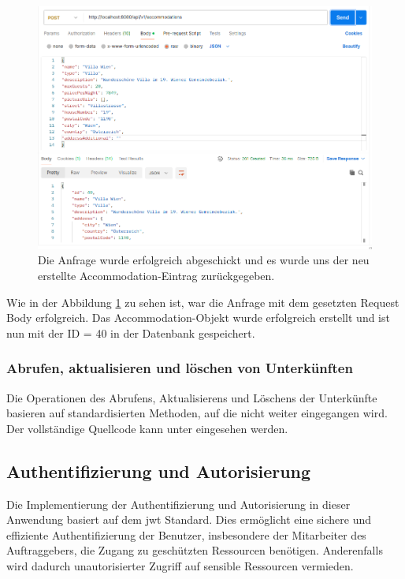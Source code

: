 		\begin{figure}
			\centering
			\includegraphics[width=1\textwidth]{images/impl-new-booking-post-acc-req.png}
			\caption{Die Anfrage wurde erfolgreich abgeschickt und es wurde uns der neu erstellte Accommodation-Eintrag zurückgegeben.}
            \label{impl-new-booking-post-acc-req}
		\end{figure}
		
		Wie in der Abbildung \ref{impl-new-booking-post-acc-req} zu sehen ist, war die Anfrage mit dem gesetzten Request Body erfolgreich. Das Accommodation-Objekt wurde erfolgreich erstellt und ist nun mit der ID = 40 in der Datenbank gespeichert. 
		
		\subsubsection{Abrufen, aktualisieren und löschen von Unterkünften}
		
		Die Operationen des Abrufens, Aktualisierens und Löschens der Unterkünfte basieren auf standardisierten Methoden, auf die nicht weiter eingegangen wird. Der vollständige Quellcode kann unter \cite{website-git-backend-repo} eingesehen werden.
		
		\subsection{Authentifizierung und Autorisierung}
		
		Die Implementierung der Authentifizierung und Autorisierung in dieser Anwendung basiert auf dem \gls{jwt} Standard. Dies ermöglicht eine sichere und effiziente Authentifizierung der Benutzer, insbesondere der Mitarbeiter des Auftraggebers, die Zugang zu geschützten Ressourcen benötigen. Anderenfalls wird dadurch unautorisierter Zugriff auf sensible Ressourcen vermieden.
		
